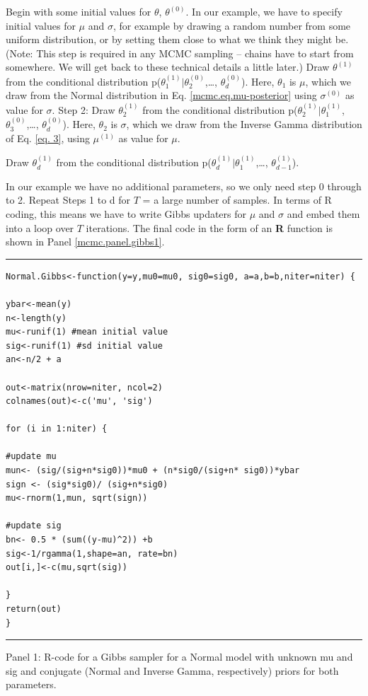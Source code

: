 { Begin with some initial values for $\theta$, $\theta^{(0)}$.   }
In our example, we have to specify initial values for $\mu$ and $\sigma$, for
example by drawing a random number from some uniform distribution, or
by setting them close to what we think they might be. (Note: This step
is required in any MCMC sampling – chains have to start from
somewhere. We will get back to these technical details a little
later.)
{ Draw $\theta^{(1)}$ from the conditional distribution p($\theta_{1}^{(1)}|\theta_{2}^{(0)}$,\ldots, $\theta_{d}^{(0)}$). }
Here, $\theta_1$ is $\mu$, which we draw from the Normal distribution in Eq. \ref{mcmc.eq.mu-posterior}  using $\sigma^{(0)}$ as value for $\sigma$.
{\flushleft Step 2: Draw $\theta_{2}^{(1)}$ from the conditional distribution p($\theta_{2}^{(1)}|\theta_{1}^{(1)}$, $\theta_{3}^{(0)}$,\ldots, $\theta_{d}^{(0)}$). }
Here, $\theta_2$ is $\sigma$, which we draw from the Inverse Gamma
distribution of Eq. \ref{eq. 3}, using $\mu^{(1)}$ as value for $\mu$.

{ Draw $\theta_{d}^{(1)}$ from the conditional distribution p($\theta_{d}^{(1)}|\theta_{1}^{(1)}$,\ldots, $\theta_{d-1}^{(1)}$). }

In our example we have no additional parameters, so we only need step 0 through to 2.
Repeat Steps 1 to d for $T$ = a large number of samples.
In terms of R coding, this means we have to write Gibbs updaters for
$\mu$ and $\sigma$ and embed them into a loop over $T$ iterations. The final
code in the form of an {\bf R} function is shown 
in Panel \ref{mcmc.panel.gibbs1}.


\begin{panel}[htp]
\centering
\rule[0.15in]{\textwidth}{.03in}
\begin{verbatim}
Normal.Gibbs<-function(y=y,mu0=mu0, sig0=sig0, a=a,b=b,niter=niter) {

ybar<-mean(y)
n<-length(y)
mu<-runif(1) #mean initial value
sig<-runif(1) #sd initial value
an<-n/2 + a

out<-matrix(nrow=niter, ncol=2)
colnames(out)<-c('mu', 'sig')

for (i in 1:niter) {

#update mu
mun<- (sig/(sig+n*sig0))*mu0 + (n*sig0/(sig+n* sig0))*ybar
sign <- (sig*sig0)/ (sig+n*sig0)
mu<-rnorm(1,mun, sqrt(sign))

#update sig
bn<- 0.5 * (sum((y-mu)^2)) +b
sig<-1/rgamma(1,shape=an, rate=bn)
out[i,]<-c(mu,sqrt(sig))

}
return(out)
}
\end{verbatim}
\rule[-0.15in]{\textwidth}{.03in}
\caption{
Panel 1: R-code for a Gibbs sampler for a Normal model with unknown mu
and sig and conjugate (Normal and Inverse Gamma, respectively) priors
for both parameters.
}
\label{mcmc.panel.m0}
\end{panel}













